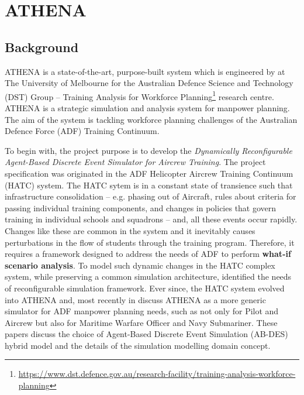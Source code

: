 \chapter{ATHENA} 

\label{Chapter2}

\section{Background}

ATHENA is a state-of-the-art, purpose-built system which is engineered by \textit{\groupname} at The University of Melbourne for the Australian Defence Science and Technology (DST) Group -- Training Analysis for Workforce Planning\footnote{\url{https://www.dst.defence.gov.au/research-facility/training-analysis-workforce-planning}} research centre. ATHENA is a strategic simulation and analysis system for manpower planning. The aim of the system is tackling workforce planning challenges of the Australian Defence Force (ADF) Training Continuum. 

To begin with, the project purpose is to develop the \textit{Dynamically Reconfigurable Agent-Based Discrete Event Simulator for Aircrew Training}. The project specification was originated in the ADF Helicopter Aircrew Training Continuum (HATC) system. The HATC\parencite{HATC} sytem is in a constant state of transience such that infrastructure consolidation -- e.g. phasing out of Aircraft, rules about criteria for passing individual training components, and changes in policies that govern training in individual schools and squadrons -- and, all these events occur rapidly. Changes like these are common in the system and it inevitably causes perturbations in the flow of students through the training program. Therefore, it requires a framework designed to address the needs of ADF to perform \textbf{what-if scenario analysis}. To model such dynamic changes in the HATC complex system, while preserving a common simulation architecture, \parencite{HATC} identified the needs of reconfigurable simulation framework. Ever since, the HATC system evolved into ATHENA and, most recently in \parencite{8248116} discuss ATHENA as a more generic simulator for ADF manpower planning needs, such as not only for Pilot and Aircrew but also for Maritime Warfare Officer and Navy Submariner.
These papers discuss the choice of Agent-Based Discrete Event Simulation (AB-DES) hybrid model and the details of the simulation modelling domain concept.

